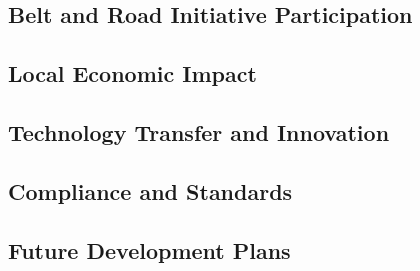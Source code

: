 \subsection{Belt and Road Initiative Participation}

\subsection{Local Economic Impact}

\subsection{Technology Transfer and Innovation}

\subsection{Compliance and Standards}

\subsection{Future Development Plans}
